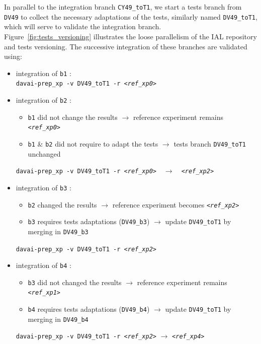 \documentclass[a4paper,10pt,twoside]{article}
\begin{document}
\noindent In parallel to the integration branch \texttt{CY49\_toT1}, we start a tests branch from \texttt{DV49} to collect the necessary adaptations of the tests, similarly named \texttt{DV49\_toT1}, which will serve to validate the integration branch.\\

Figure~\ref{fig:tests_versioning} illustrates the loose parallelism of the IAL repository and tests versioning.
The successive integration of these branches are validated using:
\begin{itemize}
 \item integration of \texttt{b1} :\\
 \texttt{davai-prep\_xp -v DV49\_toT1 -r \textit{<ref\_xp0>}}
 
 \item integration of \texttt{b2} :
 \begin{itemize}
  \item \texttt{b1} did not change the results $\rightarrow$ reference experiment remains \texttt{\textit{<ref\_xp0>}}
  \item \texttt{b1} \& \texttt{b2} did not require to adapt the tests $\rightarrow$ tests branch \texttt{DV49\_toT1} unchanged
 \end{itemize}
 \texttt{davai-prep\_xp -v DV49\_toT1 -r \textit{<ref\_xp0>}} $~~~\rightarrow~~~$ \textit{\texttt{<ref\_xp2>}}
 
 \item integration of \texttt{b3} :
 \begin{itemize}
  \item \texttt{b2} changed the results $\rightarrow$ reference experiment becomes \textit{\texttt{<ref\_xp2>}}
  \item \texttt{b3} requires tests adaptations (\texttt{DV49\_b3}) $\rightarrow$ update \texttt{DV49\_toT1} by merging in \texttt{DV49\_b3}
 \end{itemize}
 \texttt{davai-prep\_xp -v DV49\_toT1 -r \textit{<ref\_xp2>}}
 
 \item integration of \texttt{b4} :
 \begin{itemize}
  \item \texttt{b3} did not changed the results $\rightarrow$ reference experiment remains \textit{\texttt{<ref\_xp1>}}
  \item \texttt{b4} requires tests adaptations (\texttt{DV49\_b4}) $\rightarrow$ update \texttt{DV49\_toT1} by merging in \texttt{DV49\_b4}
 \end{itemize}
 \texttt{davai-prep\_xp -v DV49\_toT1 -r \textit{<ref\_xp2>}} $\rightarrow$ \texttt{\textit{<ref\_xp4>}}
  

\end{itemize}
\end{document}
